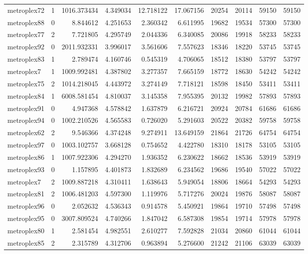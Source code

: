 \begin{longtable}{|l|r|r|r|r|r|r|r|r|r|}
metroplex72 & 1 & 1016.373434 & 4.349034 & 12.718122 & 17.067156 & 20254 & 20114 & 59150 & 59150 \\
metroplex88 & 0 & 8.844612 & 4.251653 & 2.360342 & 6.611995 & 19682 & 19534 & 57300 & 57300 \\
metroplex77 & 2 & 7.721805 & 4.295749 & 2.044336 & 6.340085 & 20086 & 19918 & 58233 & 58233 \\
metroplex92 & 0 & 2011.932331 & 3.996017 & 3.561606 & 7.557623 & 18346 & 18220 & 53745 & 53745 \\
metroplex83 & 1 & 2.789474 & 4.160746 & 0.545319 & 4.706065 & 18512 & 18380 & 53797 & 53797 \\
metroplex7 & 1 & 1009.992481 & 4.387802 & 3.277357 & 7.665159 & 18772 & 18630 & 54242 & 54242 \\
metroplex75 & 2 & 1014.218045 & 4.443972 & 3.274149 & 7.718121 & 18598 & 18450 & 53411 & 53411 \\
metroplex84 & 1 & 6008.581454 & 4.810037 & 3.145358 & 7.955395 & 20132 & 19982 & 57893 & 57893 \\
metroplex91 & 0 & 4.947368 & 4.578842 & 1.637879 & 6.216721 & 20924 & 20784 & 61686 & 61686 \\
metroplex94 & 0 & 1002.210526 & 4.565583 & 0.726020 & 5.291603 & 20522 & 20382 & 59758 & 59758 \\
metroplex62 & 2 & 9.546366 & 4.374248 & 9.274911 & 13.649159 & 21864 & 21726 & 64754 & 64754 \\
metroplex97 & 0 & 1003.102757 & 3.668128 & 0.754652 & 4.422780 & 18310 & 18178 & 53105 & 53105 \\
metroplex86 & 1 & 1007.922306 & 4.294270 & 1.936352 & 6.230622 & 18662 & 18536 & 53919 & 53919 \\
metroplex93 & 0 & 1.157895 & 4.401873 & 1.832689 & 6.234562 & 19686 & 19540 & 57022 & 57022 \\
metroplex7 & 2 & 1009.887218 & 4.310411 & 1.638643 & 5.949054 & 18806 & 18664 & 54293 & 54293 \\
metroplex81 & 2 & 1006.481203 & 4.597300 & 1.119976 & 5.717276 & 20024 & 19876 & 58087 & 58087 \\
metroplex96 & 0 & 2.052632 & 4.536343 & 0.914578 & 5.450921 & 19864 & 19710 & 57498 & 57498 \\
metroplex95 & 0 & 3007.809524 & 4.740266 & 1.847042 & 6.587308 & 19854 & 19714 & 57978 & 57978 \\
metroplex80 & 1 & 2.581454 & 4.982551 & 2.610277 & 7.592828 & 21034 & 20860 & 61044 & 61044 \\
metroplex85 & 2 & 2.315789 & 4.312706 & 0.963894 & 5.276600 & 21242 & 21106 & 63039 & 63039 \\

\end{longtable}
